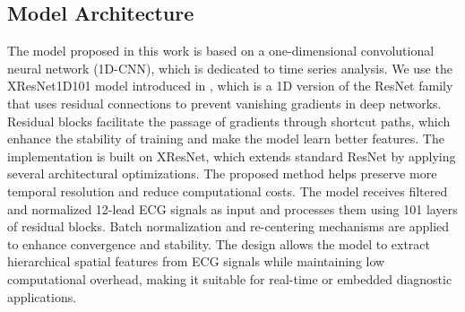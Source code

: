 \documentclass[a4paper,fleqn]{cas-dc}
\begin{document}
\subsection{Model Architecture}
The model proposed in this work is based on a one-dimensional convolutional neural network (1D-CNN), which is dedicated to time series analysis. We use the XResNet1D101 model introduced in \cite{strodthoff2020deep}, which is a 1D version of the ResNet family that uses residual connections to prevent vanishing gradients in deep networks. Residual blocks facilitate the passage of gradients through shortcut paths, which enhance the stability of training and make the model learn better features. The implementation is built on XResNet, which extends standard ResNet by applying several architectural optimizations. The proposed method helps preserve more temporal resolution and reduce computational costs. The model receives filtered and normalized 12-lead ECG signals as input and processes them using 101 layers of residual blocks. Batch normalization and re-centering mechanisms are applied to enhance convergence and stability. The design allows the model to extract hierarchical spatial features from ECG signals while maintaining low computational overhead, making it suitable for real-time or embedded diagnostic applications.
\end{document}
